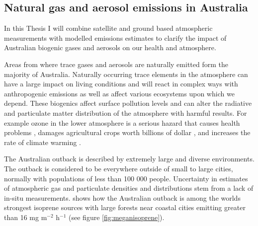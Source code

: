 \subsection{Natural gas and aerosol emissions in Australia}

In this Thesis I will combine satellite and ground based atmospheric measurements with modelled emissions estimates to clarify the impact of Australian biogenic gases and aerosols on our health and atmosphere.

Areas from where trace gases and aerosols are naturally emitted form the majority of Australia.
Naturally occurring trace elements in the atmosphere can have a large impact on living conditions and will react in complex ways with anthropogenic emissions as well as affect various ecosystems upon which we depend.
These biogenics affect surface pollution levels and can alter the radiative and particulate matter distribution of the atmosphere with harmful results.
For example ozone in the lower atmosphere is a serious hazard that causes health problems \cite{Hsieh_2013}, damages agricultural crops worth billions of dollar \cite{Avnery_2011}, and increases the rate of climate warming \cite{IPCC_2013_chap8}. 

The Australian outback is described by extremely large and diverse environments. 
The outback is considered to be everywhere outside of small to large cities, normally with populations of less than 100 000 people.
Uncertainty in estimates of atmospheric gas and particulate densities and distributions stem from a lack of in-situ measurements.
\citet{Guenther_2006} shows how the Australian outback is among the worlds strongest isoprene sources with large forests near coastal cities emitting greater than 16 mg m$^{-2}$ h$^{-1}$ (see figure \ref{fig:meganisoprene}).

  